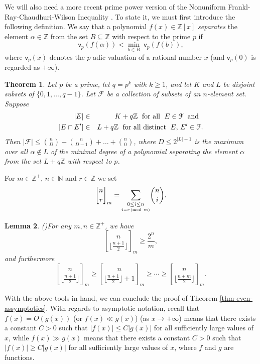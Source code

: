 \documentclass[11pt,reqno]{amsart}
\numberwithin{equation}{section}
\newtheorem{Theorem} {Theorem} [section]
\newtheorem{Lemma} [Theorem] {Lemma}
\theoremstyle{definition}
\numberwithin{equation}{section}
\begin{document}
We will also need a more recent prime power version of the
Nonuniform Frankl-Ray-Chaudhuri-Wilson Inequality
\cite{prime-power-frankl-wilson}. To state it, we must first
introduce the following definition. We say that a polynomial
$f(x)\in {\mathbb Z}[x]$ {\it separates} the element $\alpha \in {\mathbb Z}$ from the
set $B\subseteq {\mathbb Z}$ with respect to the prime $p$ if $${\mathsf v}_p
(f(\alpha))<\min_{b\in B}\;{\mathsf v}_p(f(b)),$$ where ${\mathsf v}_p(x)$ denotes
the $p$-adic valuation of a rational number $x$ (and ${\mathsf v}_p(0)$ is
regarded as $+\infty$).

\begin{Theorem}\label{thm-primepower} Let $p$ be a prime, let $q=p^k$ with $k\geq 1$, and let $K$ and $L$
be disjoint subsets of $\{0,1,\ldots,q-1\}$. Let $\mathcal F$ be a collection of subsets of an $n$-element set.
Suppose \begin{eqnarray}{\nonumber}|E|&\in& K+q{\mathbb Z}\;\mbox{ for all }\;E\in \mathcal F{\;\mbox{ and } \;}\\ |E\cap E'|&\in& L+q{\mathbb Z}\;
\mbox{ for all distinct }\;E,\,E'\in \mathcal{F}.{\nonumber}\end{eqnarray}
Then $|\mathcal F|\leq \binom{n}{D}+\binom{n}{D-1}+\ldots+\binom{n}{0}$, where $D\leq 2^{|L|-1}$
is the maximum over all $\alpha\notin L$
of the minimal degree of a polynomial separating the element $\alpha$ from the set $L+q{\mathbb Z}$   with respect to $p$.
\end{Theorem}

For $m\in{\mathbb Z}^+$, $n\in{\mathbb N}$ and $r\in{\mathbb Z}$ we set
$${\genfrac{[}{]}{0pt}{}{{n}}{{r}}}_m={\sum_{{\underset{i\equiv r\,({\rm mod}\ m)}{0\le i\le n}}}^{{}}}\binom{n}{i}.$$

\begin{Lemma} {\rm (\cite[Remark 1.1]{Sun08})}\label{sbinom-lemma} For any $m,n\in{\mathbb Z}^+$, we have
$${\genfrac{[}{]}{0pt}{}{{n}}{{\lfloor \frac{n+1}{2}\rfloor}}}_m\geq
\frac{2^n}{m},$$
and furthermore
\begin{equation}\label{goaly}{\genfrac{[}{]}{0pt}{}{{n}}{{\lfloor\frac{n+1}{2}\rfloor}}}_m\geq
{\genfrac{[}{]}{0pt}{}{{n}}{{\lfloor\frac{n+1}{2}\rfloor+1}}}_m \geq \cdots\geq
{\genfrac{[}{]}{0pt}{}{{n}}{{\lfloor\frac{n+m}{2}\rfloor}}}_m.\end{equation}
\end{Lemma}

With the above tools in hand, we can conclude the proof of Theorem
\ref{thm-even-assymptotics}.
 With regards to asymptotic notation, recall that $f(x)=O(g(x))$ (or $f(x)\ll g(x)$) (as $x\to+\infty$)
  means that there exists a constant $C> 0$
 such that $|f(x)|\leq C|g(x)|$ for all sufficiently large values of $x$, while $f(x)\gg g(x)$
 means that there exists a constant $C>0$ such that $|f(x)|\geq C|g(x)|$ for all sufficiently large values of $x$,
 where $f$ and $g$ are functions.
\end{document}
